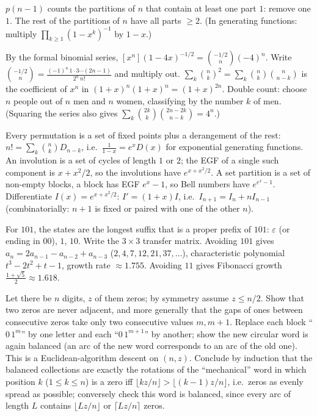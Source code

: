\documentclass[11pt,a4paper]{article}
\begin{document}

\(p(n-1)\) counts the partitions of \(n\) that contain at least one part \(1\): remove one \(1\). The rest of the partitions of \(n\) have all parts \(\ge2\). (In generating functions: multiply \(\prod_{k\ge1}(1-x^k)^{-1}\) by \(1-x\).)

By the formal binomial series, \([x^n](1-4x)^{-1/2}=\binom{-1/2}{n}(-4)^n\). Write \(\binom{-1/2}{n}=\frac{(-1)^n\,1\cdot3\cdots(2n-1)}{2^n\,n!}\) and multiply out.
\(\sum_k\binom nk^2=\sum_k\binom nk\binom n{n-k}\) is the coefficient of \(x^n\) in \((1+x)^n(1+x)^n=(1+x)^{2n}\). Double count: choose \(n\) people out of \(n\) men and \(n\) women, classifying by the number \(k\) of men. (Squaring the series also gives \(\sum_k\binom{2k}k\binom{2n-2k}{n-k}=4^n\).)

Every permutation is a set of fixed points plus a derangement of the rest: \(n!=\sum_k\binom nkD_{n-k}\), i.e.~\(\frac1{1-x}=e^xD(x)\) for exponential generating functions.
An involution is a set of cycles of length \(1\) or \(2\); the EGF of a single such component is \(x+x^2/2\), so the involutions have \(e^{x+x^2/2}\). A set partition is a set of non-empty blocks, a block has EGF \(e^x-1\), so Bell numbers have \(e^{e^x-1}\).
Differentiate \(I(x)=e^{x+x^2/2}\): \(I'=(1+x)I\), i.e.~\(I_{n+1}=I_n+nI_{n-1}\) (combinatorially: \(n+1\) is fixed or paired with one of the other \(n\)).

For \(101\), the states are the longest suffix that is a proper prefix of \(101\): \(\varepsilon\) (or ending in \(00\)), \(1\), \(10\). Write the \(3\times3\) transfer matrix.
Avoiding \(101\) gives \(a_n=2a_{n-1}-a_{n-2}+a_{n-3}\) (\(2,4,7,12,21,37,\dots\)), characteristic polynomial \(t^3-2t^2+t-1\), growth rate \(\approx1.755\). Avoiding \(11\) gives Fibonacci growth \(\frac{1+\sqrt5}2\approx1.618\).

Let there be \(n\) digits, \(z\) of them zeros; by symmetry assume \(z\le n/2\). Show that two zeros are never adjacent, and more generally that the gaps of ones between consecutive zeros take only two consecutive values \(m,m+1\).
Replace each block ``\(0\,1^m\)'' by one letter and each ``\(0\,1^{m+1}\)'' by another; show the new circular word is again balanced (an arc of the new word corresponds to an arc of the old one). This is a Euclidean-algorithm descent on \((n,z)\).
Conclude by induction that the balanced collections are exactly the rotations of the ``mechanical'' word in which position \(k\) (\(1\le k\le n\)) is a zero iff \(\lfloor kz/n\rfloor\gt\lfloor (k-1)z/n\rfloor\), i.e.~zeros as evenly spread as possible; conversely check this word is balanced, since every arc of length \(L\) contains \(\lfloor Lz/n\rfloor\) or \(\lceil Lz/n\rceil\) zeros.
\end{document}
